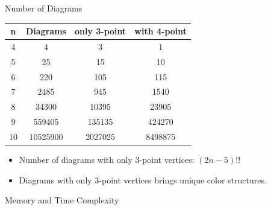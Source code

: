 \documentclass{beamer}
\begin{document}
\begin{frame}{Number of Diagrams}
    \begin{table}[htbp]\centering
        \begin{tabular}{c c c c }
            \hline
            \textbf{n} & \textbf{Diagrams} & \textbf{only 3-point} & \textbf{with 4-point} \\
            \hline
            4 & 4 & 3 & 1 \\
            5 & 25 & 15 & 10 \\
            6 & 220 & 105 & 115 \\
            7 & 2485 & 945 & 1540 \\
            8 & 34300 & 10395 & 23905 \\
            9 & 559405 & 135135 & 424270 \\
            10 & 10525900 & 2027025 & 8498875 \\
            \hline    
        \end{tabular}
    \end{table}
    \begin{itemize}
        \item Number of diagrams with only 3-point vertices: $(2n-5)!!$
        \item Diagrams with only 3-point vertices brings unique color structures.
        \end{itemize}
\end{frame}

\begin{frame}{Memory and Time Complexity}
    \centering
    \begin{table}
        \caption*{$\mathcal{M} = \sum \text{diagrams} $}
        \scriptsize
    \end{table}
\end{frame}
\end{document}
